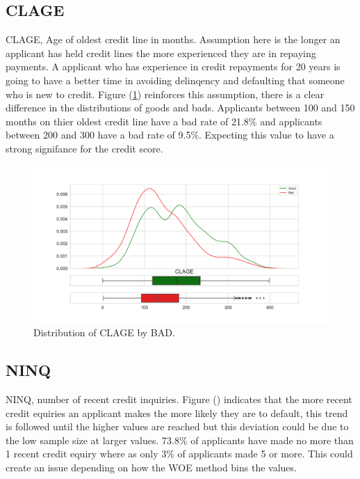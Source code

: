 \subsection*{CLAGE}

CLAGE, Age of oldest credit line in months. Assumption here is the longer an applicant has held credit lines the more experienced they are in repaying payments. A applicant who has experience in credit repayments for 20 years is going to have a better time in avoiding delinqency and defaulting that someone who is new to credit. Figure (\ref{clage_dist}) reinforces this assumption, there is a clear difference in the distributions of goods and bads. Applicants between 100 and 150 months on thier oldest credit line have a bad rate of 21.8\% and applicants between 200 and 300 have a bad rate of 9.5\%. Expecting this value to have a strong signifance for the credit score.

\begin{figure}[!ht]
	\centering
	\includegraphics[scale=0.40]{figs/clage_dist.pdf}
	\caption{Distribution of CLAGE by BAD. \label{clage_dist}}
\end{figure}

\subsection*{NINQ}

NINQ, number of recent credit inquiries. Figure (\label{ninq_cat}) indicates that the more recent credit equiries an applicant makes the more likely they are to default, this trend is followed until the higher values are reached but this deviation could be due to the low sample size at larger values. 73.8\% of applicants have made no more than 1 recent credit equiry where as only 3\% of applicants made 5 or more. This could create an issue depending on how the WOE method bins the values.

